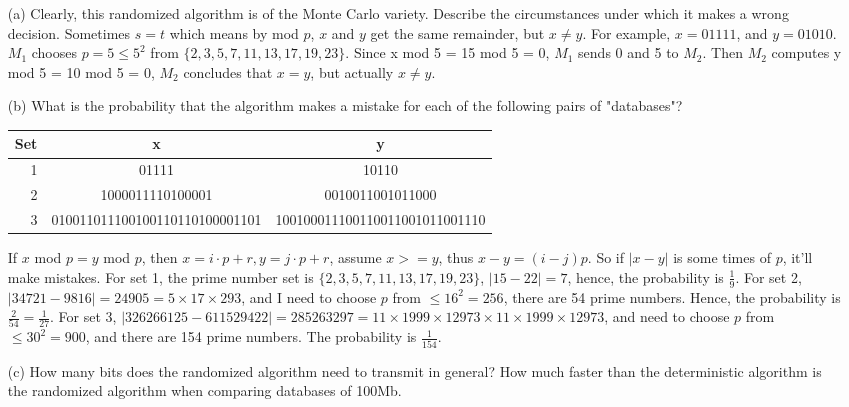 \documentclass{article}       %
\begin{document}
\begin{enumerate}
\begin{enumerate}
		\item[(a)] Clearly, this randomized algorithm is of the Monte Carlo variety. Describe the circumstances under which it makes a wrong decision.\newline\newline
		Sometimes $s=t$ which means by mod $p$, $x$ and $y$ get the same remainder, but $x \neq y$.\newline
		For example,  $x = 01111$, and $y = 01010$. $M_1$ chooses $p = 5 \leq 5^2$ from $\{2,3,5,7,11,13,17,19,23\}$.  Since x mod 5 = 15 mod 5 = 0, $M_1$ sends 0 and 5 to $M_2$. Then $M_2$ computes y mod 5 = 10 mod 5 = 0, $M_2$ concludes that $x = y$, but actually $x\neq y$.\newline
		\item[(b)] What is the probability that the algorithm makes a mistake for each of the following pairs of "databases"?\newline
		\begin{tabular}{ | r | c | c | }
			\hline
			Set & x & y \\ \hline
			1 & 01111 & 10110 \\ \hline
			2 & 1000011110100001 & 0010011001011000 \\ \hline
			3 & 010011011100100110110100001101 & 100100011100110011001011001110 \\ \hline
		\end{tabular}\newline\newline
		If $x$ mod $p = y$ mod $p$, then $x = i \cdot p + r, y = j \cdot p + r$, assume $x >= y$, thus $x-y = (i-j)p$. So if $|x-y|$ is some times of $p$, it'll make mistakes.\newline
		For set 1, the prime number set is $\{2,3,5,7,11,13,17,19,23\}$, $|15-22| = 7$,
		hence, the probability is $\frac{1}{9}$.\newline
		For set 2, $|34721 - 9816|=24905=5\times 17 \times 293$, and I need to choose $p$ from $\leq 16^2=256$, there are 54 prime numbers. Hence, the probability is $\frac{2}{54} = \frac{1}{27}$.\newline
		For set 3, $|326266125-611529422|=285263297=11\times 1999\times 12973 \times 11 \times 1999 \times 12973$, and need to choose $p$ from $\leq 30^2 = 900$, and there are 154 prime numbers. The probability is $\frac{1}{154}$.\newline
		\item[(c)] How many bits does the randomized algorithm need to transmit in general? How much faster than the deterministic algorithm is the randomized algorithm when comparing databases of 100Mb.\newline\newline

\end{enumerate}
\end{enumerate}
\end{document}
